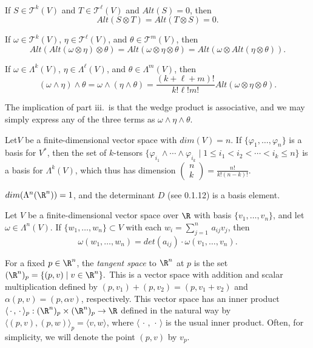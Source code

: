 \documentclass{book}
\begin{document}
\begin{theorem}\
\begin{thmenm}
\item
If $S\in\mathcal{T}^k(V)$ and $T\in\mathcal{T}^\ell(V)$ and $Alt(S)=0$, then
$$Alt(S\otimes T)=Alt(T\otimes S)=0.$$

\item
If $\omega\in\mathcal{T}^k(V)$, $\eta\in\mathcal{T}^\ell(V)$, and $\theta\in\mathcal{T}^m(V)$, then
$$Alt(Alt(\omega\otimes\eta)\otimes\theta)=Alt(\omega\otimes\eta\otimes\theta)=
Alt(\omega\otimes Alt(\eta\otimes\theta)).$$

\item
If $\omega\in\Lambda^k(V)$, $\eta\in\Lambda^\ell(V)$, and $\theta\in\Lambda^m(V)$, then
$$(\omega\wedge\eta)\wedge\theta=\omega\wedge(\eta\wedge\theta)=
\frac{(k+\ell+m)!}{k!\ell !m!} Alt(\omega\otimes\eta\otimes\theta).$$
\end{thmenm}

The implication of part iii.\ is that the wedge product is associative, and we may simply express
any of the three terms as $\omega\wedge\eta\wedge\theta$.
\end{theorem}

\begin{theorem}
Let$V$ be a finite-dimensional vector space with $dim(V)=n$.  
If $\{\varphi_1, \ldots, \varphi_n\}$ is a basis for $V^*$, then the set of $k$-tensors
$\{\varphi_{i_1}\wedge\cdots\wedge\varphi_{i_k}\mid 1\leq i_1<i_2< \cdots <i_k\leq n\}$
is a basis for $\Lambda^k(V)$, which thus has dimension 
$
\left(
\begin{smallmatrix} n \\ k \end{smallmatrix}
\right)
=\frac{n!}{k! (n-k)!}$.
\end{theorem}

\begin{corollary}
$dim(\Lambda^n(\R^n))=1$, and the determinant $D$ (see 0.1.12) is a basis element.
\end{corollary}

\begin{theorem}
Let $V$ be a finite-dimensional vector space over $\R$ with basis $\{v_1, \ldots, v_n\}$, and
let $\omega\in\Lambda^n(V)$.  If $\{w_1, \ldots, w_n\}\subset V$ with each 
$w_i=\sum_{j=1}^n\, a_{ij}v_j$, then
$$\omega(w_1, \ldots, w_n)= det(a_{ij})\cdot \omega(v_1, \ldots, v_n).$$
\end{theorem}

\pagebreak
\begin{definition}
For a fixed $p\in\R^n$, the {\em tangent space} to $\R^n$ at $p$ is the set 
$(\R^n)_p=\{(p,v)\mid v\in\R^n\}.$  This is a vector space with addition and scalar
multiplication defined by $(p, v_1)+(p, v_2)=(p, v_1+v_2)$ and $\alpha (p, v)=(p, \alpha v)$,
respectively.  This vector space has an inner product 
$\langle\,\cdot\, , \,\cdot\,\rangle_p:(\R^n)_p\times (\R^n)_p\to\R$ defined in the natural way
by $\langle (p, v) , (p, w) \rangle_p=\langle v , w\rangle$, where $\langle\,\cdot\, ,\,\cdot\,\rangle$ is
the usual inner product.  Often, for simplicity, we will denote the 
point $(p, v)$ by $v_p$.
\end{definition}
\end{document}
